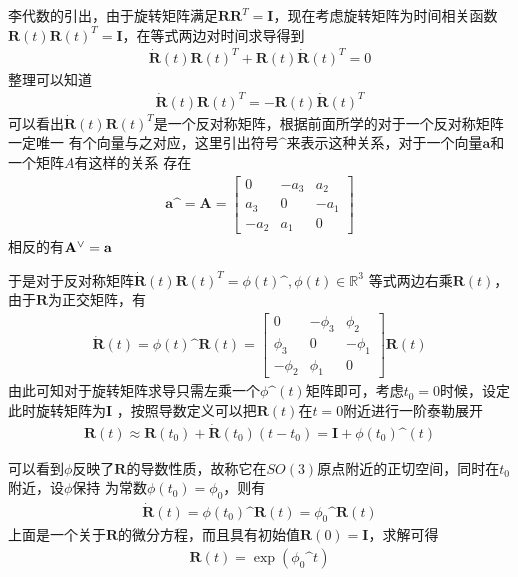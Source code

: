 \documentclass[10pt]{article}
\begin{document}
李代数的引出，由于旋转矩阵满足$\mathbf{R}\mathbf{R}^{T}=\mathbf{I}$，现在考虑旋转矩阵为时间相关函数
$\mathbf{R}(t)\mathbf{R}(t)^{T}=\mathbf{I}$，在等式两边对时间求导得到
\begin{align}  
    \dot{\mathbf{R}}(t)\mathbf{R}(t)^{T}+\mathbf{R}(t)\dot{\mathbf{R}}(t)^{T}=0
\end{align}
整理可以知道
\begin{align}  
    \dot{\mathbf{R}}(t)\mathbf{R}(t)^{T}=-\mathbf{R}(t)\dot{\mathbf{R}}(t)^{T}
\end{align}
可以看出$\dot{\mathbf{R}}(t)\mathbf{R}(t)^{T}$是一个反对称矩阵，根据前面所学的对于一个反对称矩阵一定唯一
 有个向量与之对应，这里引出符号$\sphat$来表示这种关系，对于一个向量$\mathbf{a}$和一个矩阵$A$有这样的关系
 存在
 \begin{align} 
    \mathbf{a}{\sphat}=\mathbf{A}=\left[\begin{array}{ccc}0 & -a_3 & a_2 \\ a_3 & 0 & -a_1 \\
        -a_2 & a_1 & 0 \end{array}\right]
\end{align}
相反的有$\mathbf{A}\spcheck = \mathbf{a}$

于是对于反对称矩阵$\dot{\mathbf{R}}(t)\mathbf{R}(t)^{T}=\phi(t)\sphat,\phi(t)\in\mathbb{R}^{3}$
等式两边右乘$\mathbf{R}(t)$，由于$\mathbf{R}$为正交矩阵，有
\begin{align} 
    \dot{\mathbf{R}}(t)=\phi(t)\sphat \mathbf{R}(t)=\left[\begin{array}{ccc}0 & -\phi_3 & \phi_2 \\
        \phi_3 & 0 & -\phi_1 \\ -\phi_2 & \phi_1 & 0 \end{array}\right] \mathbf{R}(t) 
\end{align}
由此可知对于旋转矩阵求导只需左乘一个$\phi\sphat(t)$矩阵即可，考虑$t_0=0$时候，设定此时旋转矩阵为$\mathbf{I}$
，按照导数定义可以把$\mathbf{R}(t)$在$t=0$附近进行一阶泰勒展开
\begin{align}  
    \mathbf{R}(t)\approx\mathbf{R}(t_0)+\dot{\mathbf{R}}(t_0)(t-t_0)=\mathbf{I}+\phi(t_0)\sphat(t)
\end{align}

可以看到$\phi$反映了$\mathbf{R}$的导数性质，故称它在$SO(3)$原点附近的正切空间，同时在$t_0$附近，设$\phi$保持
为常数$\phi(t_0)=\phi_0$，则有
\begin{align}  
    \dot{\mathbf{R}}(t)=\phi(t_0)\sphat \mathbf{R}(t)=\phi_0\sphat \mathbf{R}(t)
\end{align} 
上面是一个关于$\mathbf{R}$的微分方程，而且具有初始值$\mathbf{R}(0)=\mathbf{I}$，求解可得
\begin{align}  
    \mathbf{R}(t)=\exp(\phi_0 \sphat t)
\end{align}
\end{document}
